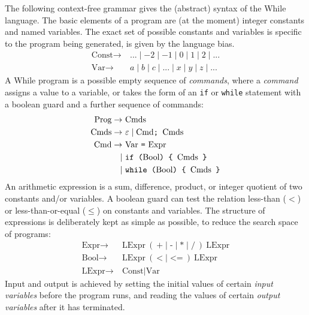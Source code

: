\documentclass[a4paper,twoside,notitlepage]{article}
\newcommand{\ttt}{\texttt}
\newcommand{\trm}{\textrm}
\begin{document}
The following context-free grammar gives the (abstract) syntax of the While 
language. The basic elements of a program are (at the moment) integer 
constants and named variables. The exact set of possible constants and 
variables is specific to the program being generated, is given by the language 
bias.
\begin{align*}
   \trm{Const} \to\ & ... \mid -2 \mid -1 \mid 0 \mid 1 \mid 2 \mid ...
\\ \trm{Var}   \to\ & a \mid b \mid c \mid ... \mid x \mid y \mid z \mid ...
\end{align*}
A While program is a possible empty sequence of \emph{commands}, where a 
\emph{command} assigns a value to a variable, or takes the form of an \ttt{if} 
or \ttt{while} statement with a boolean guard and a further sequence of 
commands:
\begin{align*}
   \trm{Prog}  \to\ & \trm{Cmds}
\\ \trm{Cmds}  \to\ & \varepsilon \mid \trm{Cmd} \ttt{; } \trm{Cmds}
\\ \trm{Cmd}   \to\ & \trm{Var} \ \ttt{=} \ \trm{Expr}
\\            \mid\ & \ttt{if (} \trm{Bool} \ttt{) \char`\{\ } \trm{Cmds} \ttt{ \char`\}}
\\            \mid\ & \ttt{while (} \trm{Bool} \ttt{) \char`\{\ } \trm{Cmds} \ttt{ \char`\}}
\end{align*}
An arithmetic expression is a sum, difference, product, or integer quotient of 
two constants and/or variables. A boolean guard can test the relation 
less-than ($<$) or less-than-or-equal ($\leq$) on constants and variables. The 
structure of expressions is deliberately kept as simple as possible, to reduce 
the search space of programs:
\begin{align*}
   \trm{Expr}  \to\ & \trm{LExpr}\ (\ \ttt{+} \mid \ttt{-} \mid \ttt{*} \mid \ttt{/}\ )\ \trm{LExpr}
\\ \trm{Bool}  \to\ & \trm{LExpr}\ (\ \ttt{<} \mid \ttt{<=}\ )\ \trm{LExpr}
\\ \trm{LExpr} \to\ & \trm{Const} \mid \trm{Var}
\end{align*}
Input and output is achieved by setting the initial values of certain 
\emph{input variables} before the program runs, and reading the values of 
certain \emph{output variables} after it has terminated.
\end{document}

